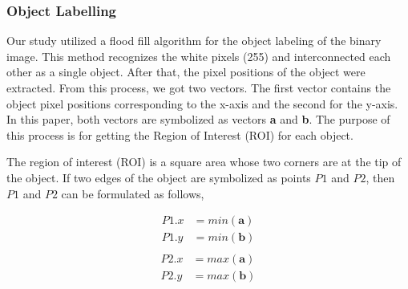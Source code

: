 \documentclass[11pt]{article}
\begin{document}
\begin{linenumbers}
\subsubsection{Object Labelling}
Our study utilized a flood fill algorithm for the object labeling of the binary image. This method recognizes the white pixels (255) and interconnected each other as a single object. After that, the pixel positions of the object were extracted. From this process, we got two vectors. The first vector contains the object pixel positions corresponding to the x-axis and the second for the y-axis. In this paper, both vectors are symbolized as vectors \textbf{a} and \textbf{b}. The purpose of this process is for getting the Region of Interest (ROI) for each object.

The region of interest (ROI)  is a square area whose two corners are at the tip of the object. If two edges of the object are symbolized as points \(P1 \) and \(P2 \), then \(P1 \) and \(P2 \) can be formulated as follows,
\begin{multicols}{2}
	\begin{equation}
		\begin{split}
			P1.x &= min(\textbf{a}) \\
			P1.y &= min(\textbf{b}) \\
		\end{split}
	\end{equation}
	\begin{equation}
		\begin{split}
				P2.x &= max(\textbf{a}) \\
				P2.y &= max(\textbf{b}) 
		\end{split}
	\end{equation}
\end{multicols}


\end{linenumbers}
\end{document}
